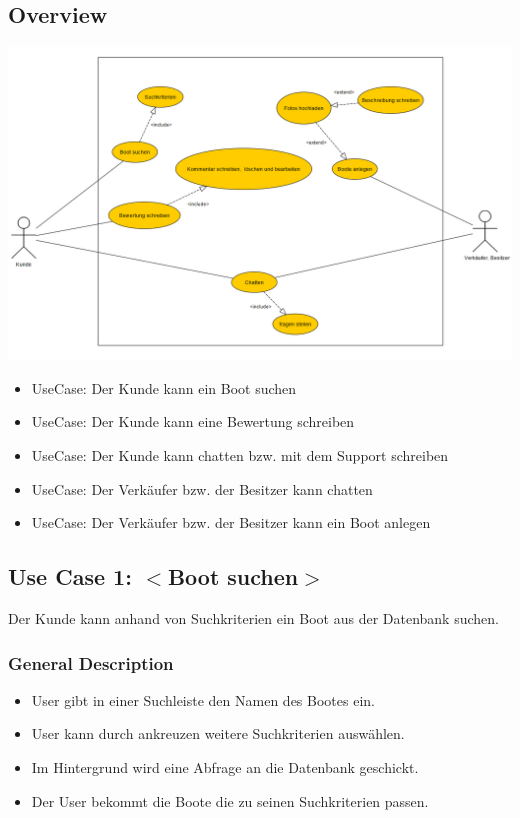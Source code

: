 \documentclass[12pt]{article}
\theoremstyle{definition}
\newenvironment{explanation}{%
   \setlength{\parindent}{0pt}
   \itshape
   \color{blue}
}{}
\begin{document}
\subsection{Overview}
\begin{explanation}
	\includegraphics[height=0.50\textwidth]{UseCaseDiagram.PNG}
	\begin{itemize}
		\item UseCase: Der Kunde kann ein Boot suchen
		\item UseCase: Der Kunde kann eine Bewertung schreiben
		\item UseCase: Der Kunde kann chatten bzw. mit dem Support schreiben
		\item UseCase: Der Verkäufer bzw. der Besitzer kann chatten
		\item UseCase: Der Verkäufer bzw. der Besitzer kann ein Boot anlegen 
	\end{itemize}
\end{explanation}

\subsection{Use Case 1: $<$Boot suchen$>$}
\begin{explanation}
Der Kunde kann anhand von Suchkriterien ein Boot aus der Datenbank suchen.
\end{explanation}
\subsubsection{General Description}
\begin{explanation}
	\begin{itemize}
		\item User gibt in einer Suchleiste den Namen des Bootes ein.
		\item User kann durch ankreuzen weitere Suchkriterien auswählen.
		\item Im Hintergrund wird eine Abfrage an die Datenbank geschickt.
		\item Der User bekommt die Boote die zu seinen Suchkriterien passen.
	\end{itemize}
\end{explanation}
\end{document}
